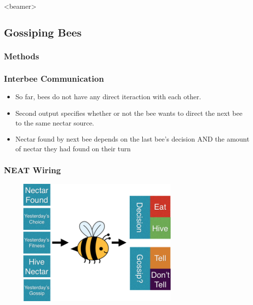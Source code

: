 \documentclass{beamer}
\begin{document}

    \setcounter{tocdepth}{2}
    \begin{frame}<beamer>
    \end{frame}
    \setcounter{tocdepth}{3}


    \subsection{Gossiping Bees} %
    \label{sub:gossipping_bees}
    
      \subsubsection{Methods} %
      \label{ssub:methods}
        \begin{frame}[c]\frametitle{Interbee Communication}
         
          \begin{itemize}
            \item So far, bees do not have any direct iteraction with each 
                  other.
            \item Second output specifies whether or not the bee wants to
                  direct the next bee to the same nectar source.
            \item Nectar found by next bee depends on the last bee's decision
                  AND the amount of nectar they had found on their turn
          \end{itemize}
        \end{frame}  


        \begin{frame}[t]\frametitle{NEAT Wiring}
          \begin{figure}
          \includegraphics[width=8cm]{bee_diagrams/gossip_system.png}
          \end{figure}
        \end{frame}
\end{document}
